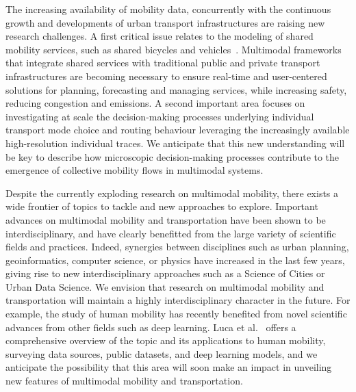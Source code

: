 The increasing availability of mobility data, concurrently with the continuous growth and developments of urban transport infrastructures are raising new research challenges. A first critical issue relates to the modeling of shared mobility services, such as shared bicycles and vehicles~\cite{shaheen2016mobility}. Multimodal frameworks that integrate shared services with traditional public and private transport infrastructures are becoming necessary to ensure real-time and user-centered solutions for planning, forecasting and managing services, while increasing safety, reducing congestion and emissions. A second important area focuses on investigating at scale the decision-making processes underlying individual transport mode choice and routing behaviour leveraging the increasingly available high-resolution individual traces. We anticipate that this new understanding will be key to describe how microscopic decision-making processes contribute to the emergence of collective mobility flows in multimodal systems.  

Despite the currently exploding research on multimodal mobility, there exists a wide frontier of topics to tackle and new approaches to explore. Important advances on multimodal mobility and transportation have been shown to be interdisciplinary, and have clearly benefitted from the large variety of scientific fields and practices. Indeed, synergies between disciplines such as urban planning, geoinformatics, computer science, or physics have increased in the last few years, giving rise to new interdisciplinary approaches such as a Science of Cities or Urban Data Science. We envision that research on multimodal mobility and transportation will maintain a highly interdisciplinary character in the future. For example, the study of human mobility has recently benefited from novel scientific advances from other fields such as deep learning. Luca et al.~\cite{luca2020deep} offers a comprehensive overview of the topic and its applications to human mobility, surveying data sources, public datasets, and deep learning models, and we anticipate the possibility that this area will soon make an impact in unveiling new features of multimodal mobility and transportation. 

